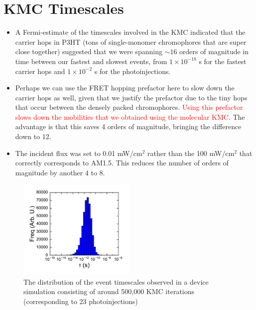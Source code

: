 \documentclass[12pt]{article}
\begin{document}
\section{KMC Timescales}


\begin{itemize}
    \item{A Fermi-estimate of the timescales involved in the KMC indicated that the carrier hops in P3HT (tons of single-monomer chromophores that are super close together) suggested that we were spanning $\sim 16$ orders of magnitude in time between our fastest and slowest events, from $1 \times 10^{-18}$ s for the fastest carrier hops and $1 \times 10^{-2}$ s for the photoinjections.}
    \item{Perhaps we can use the FRET hopping prefactor here to slow down the carrier hops as well, given that we justify the prefactor due to the tiny hops that occur between the densely packed chromophores. \textcolor{red}{Using this prefactor slows down the mobilities that we obtained using the molecular KMC}. The advantage is that this saves 4 orders of magnitude, bringing the difference down to 12.}
    \item{The incident flux was set to 0.01 mW/cm$^{2}$ rather than the 100 mW/cm$^{2}$ that correctly corresponds to AM1.5. This reduces the number of orders of magnitude by another 4 to 8.}
\end{itemize}

\begin{figure}[h!]\centering
	\includegraphics[width=0.5\textwidth]{Figures/EventTimeDist.pdf}
    \caption{The distribution of the event timescales observed in a device simulation consisting of around 500,000 KMC iterations (corresponding to 23 photoinjections)}
	\label{fig:eventTimeDist}
\end{figure}
\end{document}
